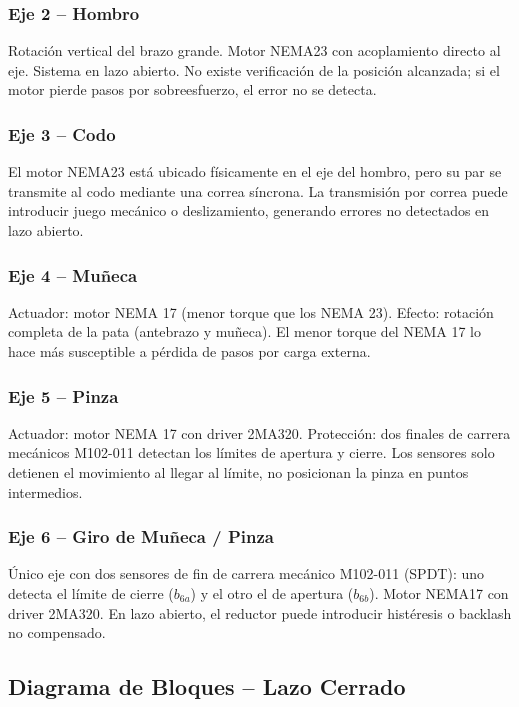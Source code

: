 \documentclass[11pt]{article}
\begin{document}
\subsubsection{Eje 2 – Hombro}

Rotación vertical del brazo grande. Motor NEMA23 con acoplamiento directo al eje. Sistema en lazo abierto. No existe verificación de la posición alcanzada; si el motor pierde pasos por sobreesfuerzo, el error no se detecta.

\subsubsection{Eje 3 – Codo}

El motor NEMA23 está ubicado físicamente en el eje del hombro, pero su par se transmite al codo mediante una correa síncrona. La transmisión por correa puede introducir juego mecánico o deslizamiento, generando errores no detectados en lazo abierto.

\subsubsection{Eje 4 – Muñeca}

Actuador: motor NEMA 17 (menor torque que los NEMA 23). Efecto: rotación completa de la pata (antebrazo y muñeca). El menor torque del NEMA 17 lo hace más susceptible a pérdida de pasos por carga externa.

\subsubsection{Eje 5 – Pinza}

Actuador: motor NEMA 17 con driver 2MA320. Protección: dos finales de carrera mecánicos M102-011 detectan los límites de apertura y cierre. Los sensores solo detienen el movimiento al llegar al límite, no posicionan la pinza en puntos intermedios.

\subsubsection{Eje 6 – Giro de Muñeca / Pinza}

Único eje con dos sensores de fin de carrera mecánico M102-011 (SPDT): uno detecta el límite de cierre ($b_{6a}$) y el otro el de apertura ($b_{6b}$). Motor NEMA17 con driver 2MA320. En lazo abierto, el reductor puede introducir histéresis o backlash no compensado.

\subsection{Diagrama de Bloques – Lazo Cerrado}
\end{document}
